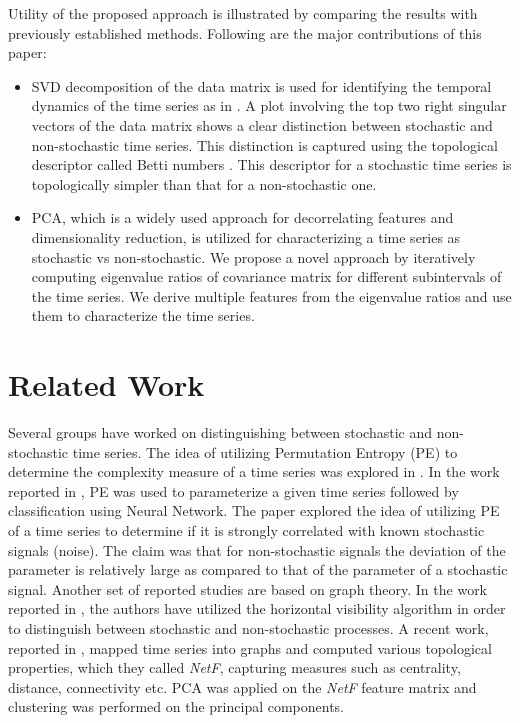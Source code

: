 \documentclass[journal]{IEEEtran}
\begin{document}
Utility of the proposed approach is illustrated by comparing the results with previously established methods. Following are the major contributions of this paper:
\begin{itemize}
\item SVD decomposition of the data matrix is used for identifying the temporal dynamics of the time series as in \cite{misra2006}. A plot involving the top two right singular vectors of the data matrix shows a clear distinction between stochastic and non-stochastic time series. This distinction is captured using the topological descriptor called Betti numbers \cite{jmlr}. This descriptor for a stochastic time series is topologically simpler than that for a non-stochastic one.

\item PCA, which is a widely used approach for decorrelating features and dimensionality reduction, is utilized for characterizing a time series as stochastic vs non-stochastic. We propose a novel approach by iteratively computing eigenvalue ratios  of covariance matrix for different subintervals of the time series. We  derive multiple features from the eigenvalue ratios and use them to characterize the time series.
\end{itemize}


\section{Related Work}
Several groups have worked on distinguishing between stochastic and non-stochastic time series. The idea of utilizing Permutation Entropy (PE) to determine the complexity measure of a time series was explored in \cite{Bandt2002}. In the work reported in \cite{Boaretto2021}, PE was used to parameterize a given time series  followed by classification using  Neural Network. The paper explored the idea of utilizing PE of a time series to determine if it is strongly correlated with known stochastic signals (noise).   The claim was that for non-stochastic signals the deviation of the parameter is relatively large as compared to that of the parameter of a stochastic signal. Another set of reported studies are based on  graph theory. In the work reported in \cite{lacasa2010}, the authors have utilized the horizontal visibility algorithm in order to distinguish between stochastic and non-stochastic processes. A recent work, reported in \cite{Silva2022}, mapped time series into  graphs and computed various topological properties, which they called \textit{NetF}, capturing  measures such as centrality, distance, connectivity etc. PCA was applied on the \textit{NetF} feature matrix and clustering was performed on the principal components.
\end{document}
